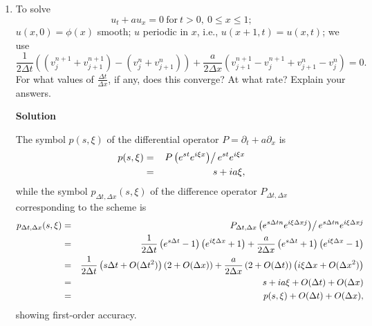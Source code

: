 \documentclass{article}
\begin{document}
\begin{enumerate}
\begin{enumerate}
\end{enumerate}



\item To solve
\[u_t + au_x = 0 \ \text{for} \ t > 0, \ 0 \leq x \leq 1;\]
\(u(x,0) = \phi(x)\) smooth; \(u\) periodic in \(x\), i.e., \(u(x + 1, t) = u(x,t)\); we use
\[\frac{1}{2\Delta t} \left( \left( v^{n+1}_j + v^{n+1}_{j+1} \right) - \left( v^n_j + v^n_{j+1} \right) \right) + \frac{a}{2\Delta x} \left( v^{n+1}_{j+1} - v^{n+1}_j + v^n_{j+1} - v^n_j \right) = 0.\]
For what values of \(\frac{\Delta t}{\Delta x}\), if any, does this converge?  At what rate?  Explain your answers.

{\bf Solution}

The symbol \(p(s,\xi)\) of the differential operator \(P = \partial_t + a \partial_x\) is
\begin{eqnarray*}
p(s,\xi)
& = & \left. P \left( e^{st} e^{i\xi x} \right) \right/ e^{st} e^{i\xi x} \\
& = & s + i a \xi,
\end{eqnarray*}
while the symbol \(p_{\Delta t, \Delta x}(s,\xi)\) of the difference operator \(P_{\Delta t, \Delta x}\) corresponding to the scheme is
\begin{eqnarray*}
p_{\Delta t, \Delta x}(s,\xi)
& = & \left. P_{\Delta t, \Delta x} \left( e^{s\Delta t n} e^{i\xi\Delta x j} \right) \right/ e^{s\Delta t n} e^{i\xi\Delta x j} \\
& = & \frac{1}{2\Delta t} \left( e^{s\Delta t} - 1 \right) \left( e^{i\xi\Delta x} + 1 \right)
    + \frac{a}{2\Delta x} \left( e^{s\Delta t} + 1 \right) \left( e^{i\xi\Delta x} - 1 \right) \\
& = & \frac{1}{2\Delta t} \left( s\Delta t + O(\Delta t^2) \right) \left( 2 + O(\Delta x) \right)
    + \frac{a}{2\Delta x} \left( 2 + O(\Delta t) \right) \left( i\xi\Delta x + O(\Delta x^2) \right) \\
& = & s + i a \xi + O(\Delta t) + O(\Delta x) \\
& = & p(s,\xi) + O(\Delta t) + O(\Delta x),
\end{eqnarray*}
showing first-order accuracy.


\end{enumerate}
\end{document}

